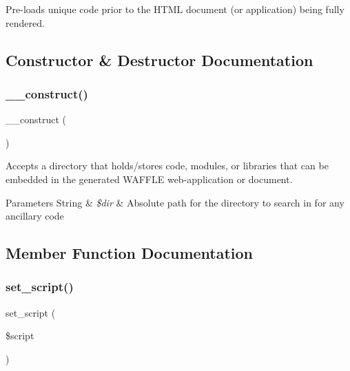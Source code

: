 Pre-\/loads unique code prior to the H\+T\+ML document (or application) being fully rendered. 

\subsection{Constructor \& Destructor Documentation}
\mbox{\label{class_w_a_f_f_l_e_1_1_framework_1_1_i_o_1_1_preload_a095c5d389db211932136b53f25f39685}} 
\subsubsection{\texorpdfstring{\+\_\+\+\_\+construct()}{\_\_construct()}}
{\footnotesize\ttfamily \+\_\+\+\_\+construct (\begin{DoxyParamCaption}{ }\end{DoxyParamCaption})}

Accepts a directory that holds/stores code, modules, or libraries that can be embedded in the generated W\+A\+F\+F\+LE web-\/application or document.


\begin{DoxyParams}[1]{Parameters}
String & {\em \$dir} & Absolute path for the directory to search in for any ancillary code \\
\hline
\end{DoxyParams}


\subsection{Member Function Documentation}
\mbox{\label{class_w_a_f_f_l_e_1_1_framework_1_1_i_o_1_1_preload_aa570cf9af0fc24953f4568db3a71ae7b}} 
\subsubsection{\texorpdfstring{set\+\_\+script()}{set\_script()}}
{\footnotesize\ttfamily set\+\_\+script (\begin{DoxyParamCaption}\item[{}]{\$script }\end{DoxyParamCaption})}

